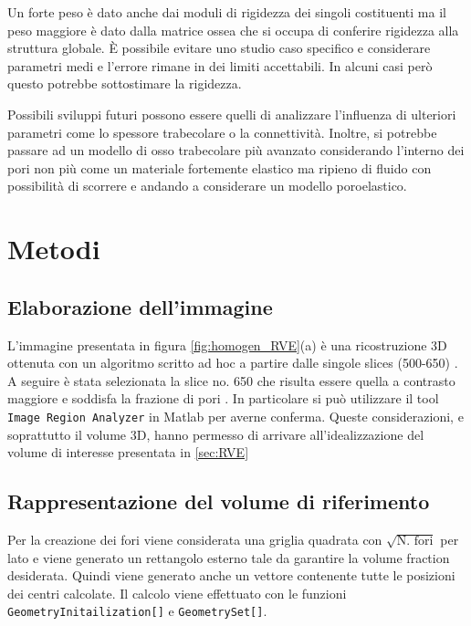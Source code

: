 \documentclass[a4paper,num-refs]{oup-contemporary}
\begin{document}
Un forte peso è dato anche dai moduli di rigidezza dei singoli costituenti ma il peso maggiore è dato dalla matrice ossea che si occupa di conferire rigidezza alla struttura globale. 
È possibile evitare uno studio caso specifico e considerare parametri medi e l'errore rimane in dei limiti accettabili. In alcuni casi però questo potrebbe sottostimare la rigidezza. 

Possibili sviluppi futuri possono essere quelli di analizzare l'influenza di ulteriori parametri come lo spessore trabecolare o la connettività. Inoltre, si potrebbe passare ad un modello di osso trabecolare più avanzato considerando l'interno dei pori non più come un materiale fortemente elastico ma ripieno di fluido con possibilità di scorrere e andando a considerare un modello poroelastico. 



\newpage

\section{Metodi}

\subsection{Elaborazione dell'immagine}

L'immagine presentata in figura \ref{fig:homogen_RVE}(a) è una ricostruzione 3D ottenuta con un algoritmo scritto ad hoc \citep{Mastrofini:21} a partire dalle singole slices (500-650) \citep{ESA:2005}. A seguire è stata selezionata la slice no. 650 che risulta essere quella a contrasto maggiore e soddisfa la frazione di pori \citep{CC21}. In particolare si può utilizzare il tool 
\texttt{Image Region Analyzer} in Matlab per averne conferma. Queste considerazioni, e soprattutto il volume 3D, hanno permesso di arrivare all'idealizzazione del volume di interesse presentata in  \cref{sec:RVE}

\subsection{Rappresentazione del volume di riferimento}
\label{sec:RVE_code}

Per la creazione dei fori viene considerata una griglia quadrata con $\sqrt{\text{N. fori}}$ per lato e viene generato un rettangolo esterno tale da garantire la volume fraction desiderata. Quindi viene generato anche un vettore contenente tutte le posizioni dei centri calcolate. Il calcolo viene effettuato con le funzioni \texttt{GeometryInitailization[]} e \texttt{GeometrySet[]}.
\end{document}
